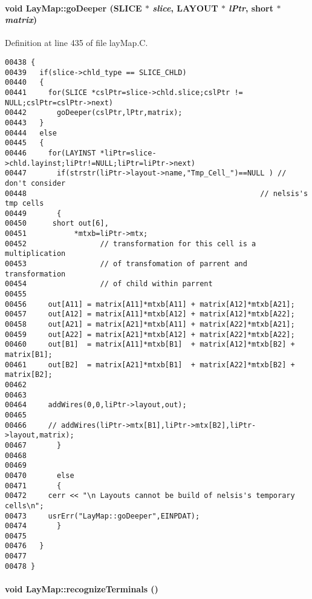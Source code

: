 \paragraph{\setlength{\rightskip}{0pt plus 5cm}void Lay\-Map::go\-Deeper (SLICE $\ast$ {\em slice}, LAYOUT $\ast$ {\em l\-Ptr}, short $\ast$ {\em matrix})\hspace{0.3cm}{\tt  [private]}}\hfill



Definition at line 435 of file lay\-Map.C.\small\begin{verbatim}00438 {
00439   if(slice->chld_type == SLICE_CHLD)
00440   {
00441     for(SLICE *cslPtr=slice->chld.slice;cslPtr != NULL;cslPtr=cslPtr->next)
00442       goDeeper(cslPtr,lPtr,matrix);
00443   }
00444   else
00445   { 
00446     for(LAYINST *liPtr=slice->chld.layinst;liPtr!=NULL;liPtr=liPtr->next)
00447       if(strstr(liPtr->layout->name,"Tmp_Cell_")==NULL ) // don't consider 
00448                                                      // nelsis's tmp cells
00449       {
00450      short out[6],
00451           *mtxb=liPtr->mtx;
00452                 // transformation for this cell is a multiplication
00453                 // of transfomation of parrent and transformation
00454                 // of child within parrent
00455     
00456     out[A11] = matrix[A11]*mtxb[A11] + matrix[A12]*mtxb[A21];
00457     out[A12] = matrix[A11]*mtxb[A12] + matrix[A12]*mtxb[A22];
00458     out[A21] = matrix[A21]*mtxb[A11] + matrix[A22]*mtxb[A21];
00459     out[A22] = matrix[A21]*mtxb[A12] + matrix[A22]*mtxb[A22];
00460     out[B1]  = matrix[A11]*mtxb[B1]  + matrix[A12]*mtxb[B2] + matrix[B1];
00461     out[B2]  = matrix[A21]*mtxb[B1]  + matrix[A22]*mtxb[B2] + matrix[B2];
00462 
00463 
00464     addWires(0,0,liPtr->layout,out);    
00465 
00466     // addWires(liPtr->mtx[B1],liPtr->mtx[B2],liPtr->layout,matrix);
00467       }
00468 
00469 
00470       else
00471       {
00472     cerr << "\n Layouts cannot be build of nelsis's temporary cells\n";
00473     usrErr("LayMap::goDeeper",EINPDAT);
00474       }
00475 
00476   }
00477 
00478 }
\end{verbatim}\normalsize 
\label{LayMap_c6}
\paragraph{\setlength{\rightskip}{0pt plus 5cm}void Lay\-Map::recognize\-Terminals ()\hspace{0.3cm}{\tt  [private]}}\hfill



